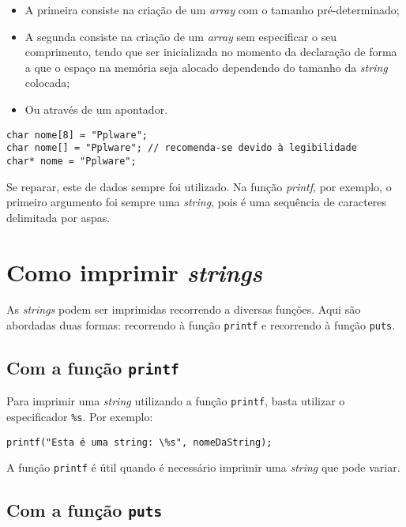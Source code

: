 \begin{itemize}
\item A primeira consiste na criação de um \textit{array} com o tamanho pré-determinado;
\item A segunda consiste na criação de um \textit{array} sem especificar o seu comprimento, tendo que ser inicializada no momento da declaração de forma a que o espaço na memória seja alocado dependendo do tamanho da \textit{string} colocada;
\item Ou através de um apontador.
\end{itemize}

\begin{lstlisting}
char nome[8] = "Pplware";
char nome[] = "Pplware"; // recomenda-se devido à legibilidade
char* nome = "Pplware"; 
\end{lstlisting}

Se reparar, este  de dados sempre foi utilizado. Na função \textit{printf}, por exemplo, o primeiro argumento foi sempre uma \textit{string}, pois é uma sequência de caracteres delimitada por aspas.

\section{Como imprimir \textit{strings}}

As \textit{strings} podem ser imprimidas recorrendo a diversas funções. Aqui são abordadas duas formas: recorrendo à função \texttt{printf} e recorrendo à função \texttt{puts}.

\subsection{Com a função \texttt{printf}}

Para imprimir uma \textit{string} utilizando a função \texttt{printf}, basta utilizar o especificador \texttt{\%s}. Por exemplo:

\begin{lstlisting}
printf("Esta é uma string: \%s", nomeDaString);
\end{lstlisting}

A função \texttt{printf} é útil quando é necessário imprimir uma \textit{string} que pode variar.

\subsection{Com a função \texttt{puts}}

